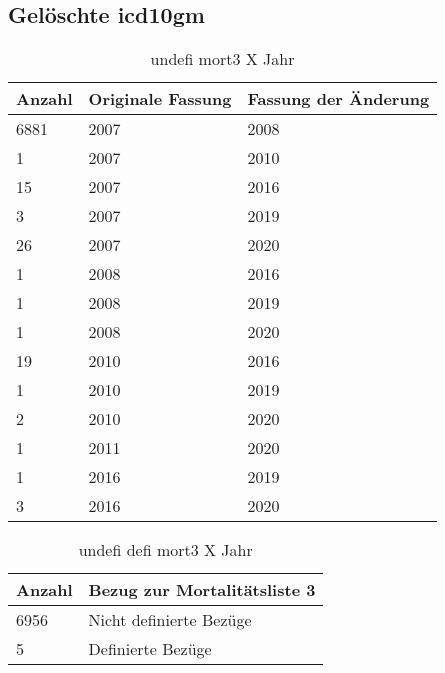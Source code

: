 
\newpage
\subsection{Gelöschte \acs{icd10gm}}
\newpage
\begin{table}[t]
	\centering
	\caption[Undefinierte Bezüge zur Mortalitätsliste 3]{undefi mort3 X Jahr}
	\label{tab:mort3}
	\begin{tabular}{|l|l|l|}
		\hline
		\rowcolor{lightgray} Anzahl & Originale Fassung & Fassung der Änderung \\ \hline
		6881 & 2007 & 2008 \\ \hline
		1 & 2007 & 2010 \\ \hline
		15 & 2007 & 2016 \\ \hline
		3 & 2007 & 2019 \\ \hline
		26 & 2007 & 2020 \\ \hline
		1 & 2008 & 2016 \\ \hline
		1 & 2008 & 2019 \\ \hline
		1 & 2008 & 2020 \\ \hline
		19 & 2010 & 2016 \\ \hline
		1 & 2010 & 2019 \\ \hline
		2 & 2010 & 2020 \\ \hline
		1 & 2011 & 2020 \\ \hline
		1 & 2016 & 2019 \\ \hline
		3 & 2016 & 2020 \\ \hline		
	\end{tabular}
\end{table}

\newpage

\begin{table}[ht]
	\centering
	\caption[Undefinierte und definierte Bezüge zur Mortalitätsliste 3]{undefi defi mort3 X Jahr}
	\label{tab:mort3defundef}
	\begin{tabular}{|l|l|}
		\hline
		\rowcolor{lightgray} Anzahl & Bezug zur Mortalitätsliste 3 \\ \hline
		6956 & Nicht definierte Bezüge \\ \hline
		5 & Definierte Bezüge \\ \hline		
	\end{tabular}
\end{table}

\newpage

